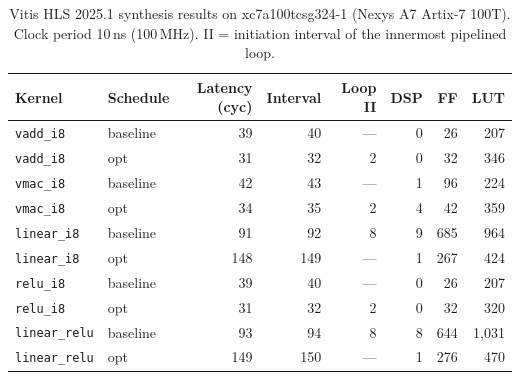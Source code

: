 \begin{table}[h]
\centering
\caption{Vitis HLS 2025.1 synthesis results on xc7a100tcsg324-1 (Nexys A7 Artix-7 100T). Clock period 10\,ns (100\,MHz). II = initiation interval of the innermost pipelined loop.}
\label{tab:synthesis}
\begin{tabular}{llrrrrrr}
\toprule
Kernel & Schedule & Latency (cyc) & Interval & Loop II & DSP & FF & LUT \\
\midrule
\texttt{vadd_i8} & baseline & 39 & 40 & --- & 0 & 26 & 207 \\
\texttt{vadd_i8} & opt & 31 & 32 & 2 & 0 & 32 & 346 \\
\midrule
\texttt{vmac_i8} & baseline & 42 & 43 & --- & 1 & 96 & 224 \\
\texttt{vmac_i8} & opt & 34 & 35 & 2 & 4 & 42 & 359 \\
\midrule
\texttt{linear_i8} & baseline & 91 & 92 & 8 & 9 & 685 & 964 \\
\texttt{linear_i8} & opt & 148 & 149 & --- & 1 & 267 & 424 \\
\midrule
\texttt{relu_i8} & baseline & 39 & 40 & --- & 0 & 26 & 207 \\
\texttt{relu_i8} & opt & 31 & 32 & 2 & 0 & 32 & 320 \\
\midrule
\texttt{linear_relu} & baseline & 93 & 94 & 8 & 8 & 644 & 1,031 \\
\texttt{linear_relu} & opt & 149 & 150 & --- & 1 & 276 & 470 \\

\bottomrule
\end{tabular}
\end{table}